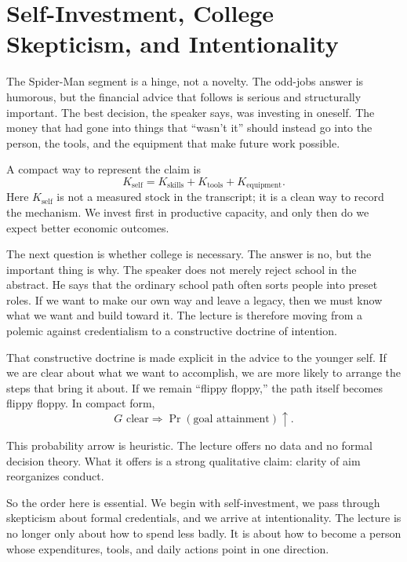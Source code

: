 \section{Self-Investment, College Skepticism, and Intentionality}

The Spider-Man segment is a hinge, not a novelty. The odd-jobs answer is humorous, but the financial advice that follows is serious and structurally important. The best decision, the speaker says, was investing in oneself. The money that had gone into things that ``wasn't it'' should instead go into the person, the tools, and the equipment that make future work possible.

A compact way to represent the claim is
\begin{equation}
K_{\text{self}} = K_{\text{skills}} + K_{\text{tools}} + K_{\text{equipment}}.
\end{equation}
Here \(K_{\text{self}}\) is not a measured stock in the transcript; it is a clean way to record the mechanism. We invest first in productive capacity, and only then do we expect better economic outcomes.

The next question is whether college is necessary. The answer is no, but the important thing is why. The speaker does not merely reject school in the abstract. He says that the ordinary school path often sorts people into preset roles. If we want to make our own way and leave a legacy, then we must know what we want and build toward it. The lecture is therefore moving from a polemic against credentialism to a constructive doctrine of intention.

That constructive doctrine is made explicit in the advice to the younger self. If we are clear about what we want to accomplish, we are more likely to arrange the steps that bring it about. If we remain ``flippy floppy,'' the path itself becomes flippy floppy. In compact form,
\begin{equation}
G \text{ clear}
\Longrightarrow
\Pr(\text{goal attainment}) \uparrow.
\end{equation}

\begin{remark}
This probability arrow is heuristic. The lecture offers no data and no formal decision theory. What it offers is a strong qualitative claim: clarity of aim reorganizes conduct.
\end{remark}

So the order here is essential. We begin with self-investment, we pass through skepticism about formal credentials, and we arrive at intentionality. The lecture is no longer only about how to spend less badly. It is about how to become a person whose expenditures, tools, and daily actions point in one direction.

